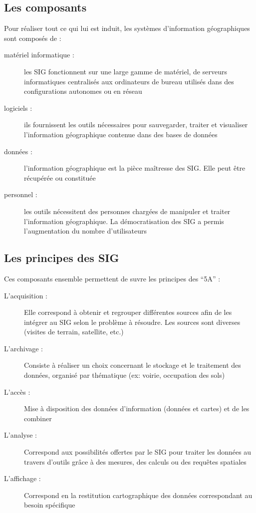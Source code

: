 \subsection{Les composants}
Pour réaliser tout ce qui lui est induit, les systèmes d’information géographiques sont composés \supercite{giscomponents} de :
\begin{description}
    \item[matériel informatique :] les \acrshort{SIG} fonctionnent sur une large gamme de matériel, de serveurs informatiques centralisés aux ordinateurs de bureau utilisés dans des configurations autonomes ou en réseau
    \item[logiciels :] ils fournissent les outils nécessaires pour sauvegarder, traiter et visualiser l’information géographique contenue dans des bases de données
    \item[données :] l’information géographique est la pièce maîtresse des \acrshort{SIG}. Elle peut être récupérée ou constituée
    \item[personnel :] les outils nécessitent des personnes chargées de manipuler et traiter l’information géographique. La démocratisation des \acrshort{SIG} a permis l’augmentation du nombre d’utilisateurs
\end{description}

\subsection{Les principes des SIG}

Ces composants ensemble permettent de suvre les principes des “5A” :
\begin{description}
    \item[L’acquisition :] Elle correspond à obtenir et regrouper différentes sources afin de les intégrer au SIG selon le problème à résoudre. Les sources sont diverses (visites de terrain, satellite, etc.)
    \item[L’archivage :] Consiste à réaliser un choix concernant le stockage et le traitement des données, organisé par thématique (ex: voirie, occupation des sols)
    \item[L’accès :] Mise à disposition des données d’information (données et cartes) et de les combiner
    \item[L’analyse :] Correspond aux possibilités offertes par le SIG pour traiter les données au travers d’outils grâce à des mesures, des calculs ou des requêtes spatiales
    \item[L’affichage :] Correspond en la restitution cartographique des données correspondant au besoin spécifique
\end{description}

